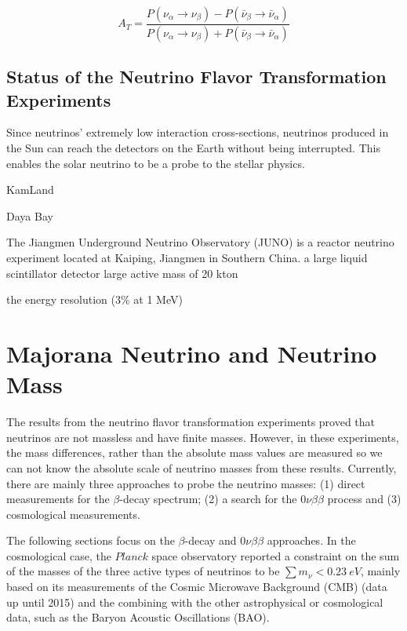 \[
A_T = \frac{P(\nu_\alpha\to\nu_\beta)-P(\bar{\nu}_\beta\to\bar{\nu}_\alpha)}{P(\nu_\alpha\to\nu_\beta)+P(\bar{\nu}_\beta\to\bar{\nu}_\alpha)}
\]

\subsection{Status of the Neutrino Flavor Transformation Experiments}

Since neutrinos' extremely low interaction cross-sections, neutrinos produced in the Sun can reach the detectors on the Earth without being interrupted. This enables the solar neutrino to be a probe to the stellar physics.

KamLand

Daya Bay

The Jiangmen Underground Neutrino Observatory (JUNO) is a reactor neutrino experiment located at Kaiping, Jiangmen in Southern China. a large liquid scintillator detector 
large active mass of 20 kton

the energy resolution (3\% at 1 MeV) 
\cite{giaz2018status}


\section{Majorana Neutrino and Neutrino Mass}\label{sectMajorana}
The results from the neutrino flavor transformation experiments proved that neutrinos are not massless and have finite masses. However, in these experiments, the mass differences, rather than the absolute mass values are measured so we can not know the absolute scale of neutrino masses from these results. Currently, there are mainly three approaches to probe the neutrino masses: (1) direct measurements for the $\beta$-decay spectrum; (2) a search for the $0\nu\beta\beta$ process and (3) cosmological measurements\cite{valle2015neutrinos}. 

The following sections focus on the $\beta$-decay and $0\nu\beta\beta$ approaches. In the cosmological case, the $Planck$ space observatory reported a constraint on the sum of the masses of the three active types of neutrinos to be $\sum m_\nu<0.23~eV$, mainly based on its measurements of the Cosmic Microwave Background (CMB) (data up until 2015) and the combining with the other astrophysical or cosmological data, such as the Baryon Acoustic Oscillations (BAO)\cite{ade2016planck}. 


